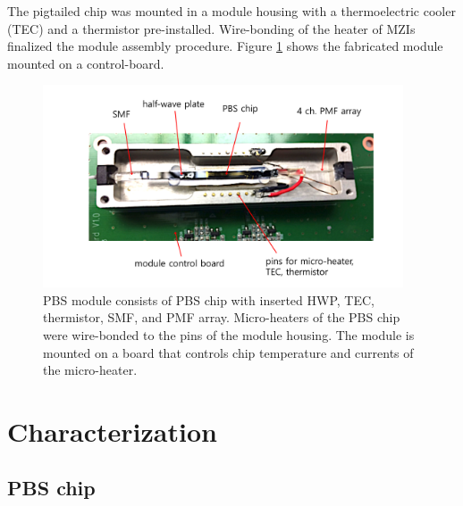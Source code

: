 \documentclass[letterpaper, 10pt]{article}
\begin{document}
The pigtailed chip was mounted in a module housing with a thermoelectric cooler (TEC) and a thermistor pre-installed.
Wire-bonding of the heater of MZIs finalized the module assembly procedure.
Figure \ref{fig:module} shows the fabricated module mounted on a control-board.
\begin{figure}
  \centering
  \includegraphics[height=6cm]{module.pdf}
  \caption{PBS module consists of PBS chip with inserted HWP, TEC, thermistor, SMF, and PMF array. Micro-heaters of the PBS chip were wire-bonded to the pins of the module housing. The module is mounted on a board that controls chip temperature and currents of the micro-heater.}
  \label{fig:module}
\end{figure}

\section{Characterization}
\subsection{PBS chip}
\end{document}
